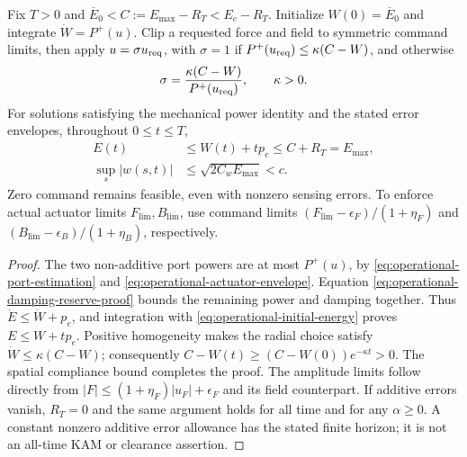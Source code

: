 \begin{proposition}
\label{prop:operational-robust-work}
Fix $T>0$ and $\overline E_0<C:=E_{\max}-R_T<E_c-R_T$.
Initialize $W(0)=\overline E_0$ and integrate $\dot W=P^+(u)$.
Clip a requested force and field to symmetric command limits, then apply
$u=\sigma u_{\rm req}$, with $\sigma=1$ if
$P^+(u_{\rm req})\leq\kappa(C-W)$, and otherwise
\begin{equation}
 \sigma=\frac{\kappa(C-W)}{P^+(u_{\rm req})},\qquad \kappa>0.
 \label{eq:operational-radial-governor}
\end{equation}
For solutions satisfying the mechanical power identity and the stated
error envelopes, throughout $0\leq t\leq T$,
\begin{equation}
 \begin{aligned}
 E(t)&\leq W(t)+tp_e\leq C+R_T=E_{\max},\\
 \sup_s|w(s,t)|&\leq\sqrt{2C_wE_{\max}}<c.
 \end{aligned}
 \label{eq:operational-robust-clearance}
\end{equation}
Zero command remains feasible, even with nonzero sensing errors. To enforce
actual actuator limits $F_{\lim},B_{\lim}$, use command limits
$(F_{\lim}-\epsilon_F)/(1+\eta_F)$ and
$(B_{\lim}-\epsilon_B)/(1+\eta_B)$, respectively.
\end{proposition}
\begin{proof}
The two non-additive port powers are at most $P^+(u)$, by
\eqref{eq:operational-port-estimation} and
\eqref{eq:operational-actuator-envelope}. Equation
\eqref{eq:operational-damping-reserve-proof} bounds the remaining power
and damping together. Thus $\dot E\leq\dot W+p_e$, and integration with
\eqref{eq:operational-initial-energy} proves $E\leq W+tp_e$.
Positive homogeneity makes the radial choice satisfy
$\dot W\leq\kappa(C-W)$; consequently
$C-W(t)\geq(C-W(0))e^{-\kappa t}>0$.
The spatial compliance bound completes the proof. The amplitude limits
follow directly from $|F|\leq(1+\eta_F)|u_F|+\epsilon_F$ and its field
counterpart. If additive errors vanish, $R_T=0$ and the same argument
holds for all time and for any $\alpha\geq0$. A constant nonzero additive
error allowance has the stated finite horizon; it is not an all-time KAM
or clearance assertion.
\end{proof}

